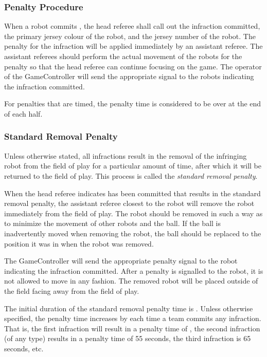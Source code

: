 

\subsubsection{Penalty Procedure}
\label{sec:penalty_procedure}

When a robot commits , the head referee shall call out the infraction committed, the primary jersey colour of the robot, and the jersey number of the robot. The penalty for the infraction will be applied immediately by an assistant referee. The assistant referees should perform the actual movement of the robots for the penalty so that the head referee can continue focusing on the game. The operator of the GameController will send the appropriate signal to the robots indicating the infraction committed.

For penalties that are timed, the penalty time is considered to be over at the end of each half.

\subsubsection{Standard Removal Penalty}
\label{sec:removal_penalty}

Unless otherwise stated, all infractions result in the removal of the infringing robot from the field of play for a particular amount of time, after which it will be returned to the field of play. This process is called the \textit{standard removal penalty}.

When the head referee indicates  has been committed that results in the standard removal penalty, the assistant referee closest to the robot will remove the robot immediately from the field of play. The robot should be removed in such a way as to minimize the movement of other robots and the ball. If the ball is inadvertently moved when removing the robot, the ball should be replaced to the position it was in when the robot was removed.

The GameController will send the appropriate penalty signal to the robot indicating the infraction committed. After a penalty is signalled to the robot, it is not allowed to move in any fashion. The removed robot will be placed outside of the field facing away from the field of play.

The initial duration of the standard removal penalty time is \StandardPenaltyTime.
Unless otherwise specified, the penalty time increases by \StandardPenaltyIncrease each time a team commits any infraction.
That is, the first infraction will result in a penalty time of \StandardPenaltyTime, the second infraction (of any type) results in a penalty time of 55 seconds, the third infraction is 65 seconds, etc.

